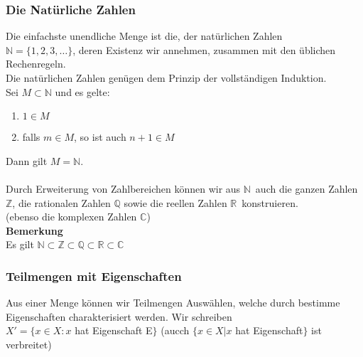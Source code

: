 \documentclass{report}
\newcommand{\N}{\mathbb{N}}
\newcommand{\mR}{$\mathbb{R}$\ }
\newcommand{\mN}{$\mathbb{N}$\ }
\theoremstyle{customrem}
\theoremstyle{customdef}
\begin{document}
\subsubsection{Die Natürliche Zahlen}
Die einfachste unendliche Menge ist die, der natürlichen Zahlen\\
$\N = \{1, 2, 3, \dots\}$, deren Existenz wir annehmen, zusammen mit den üblichen Rechenregeln.\\
Die natürlichen Zahlen genügen dem Prinzip der vollständigen Induktion.\\
Sei $M \subset \N$ und es gelte:
\begin{enumerate}
\item{$1 \in M$}
\item{falls $m \in M$, so ist auch $n + 1 \in M$}
\end{enumerate}
Dann gilt $M = \N$.\\
\\
Durch Erweiterung von Zahlbereichen können wir aus \mN auch die ganzen Zahlen $\mathbb{Z}$, die rationalen Zahlen $\mathbb{Q}$ sowie die reellen Zahlen \mR konstruieren.\\
(ebenso die komplexen Zahlen $\mathbb{C}$)\\
\textbf{Bemerkung}\\
Es gilt $\N \subset \mathbb{Z} \subset \mathbb{Q} \subset \mathbb{R} \subset \mathbb{C}$\\

\subsubsection{Teilmengen mit Eigenschaften}
Aus einer Menge können wir Teilmengen Auswählen, welche durch bestimme Eigenschaften charakterisiert werden. Wir schreiben\\
$X' = \{x \in X : x $ hat Eigenschaft E$\}$ (aucch $\{x \in X | x $ hat Eigenschaft$\}$ ist verbreitet)
\end{document}
